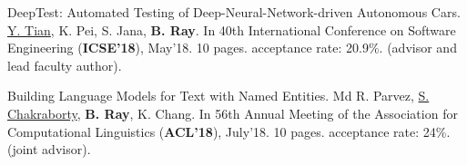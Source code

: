 
\newcommand\blue[1]{\textcolor[rgb]{0.00,0.00,1.00}{\textbf{#1}}} 


\begin{cventries}
{
  \begin{cvenumerate}
        \item 
        \paper
        {DeepTest: Automated Testing of Deep-Neural-Network-driven Autonomous Cars.}
        {\underline{Y. Tian}, K. Pei, S. Jana, \textbf{B. Ray}.} 
        {In 40th International Conference on Software Engineering (\blue{ICSE’18}), May’18.}
        {10 pages.} 
        {acceptance rate: 20.9\%.}
        {}
        {(advisor and lead faculty author).
        }
        \item 
        \paper
        {Building Language Models for Text with Named Entities.}
        {Md R. Parvez, \underline{S. Chakraborty}, \textbf{B. Ray}, K. Chang.}
        {In 56th Annual Meeting of the Association for Computational Linguistics (\blue{ACL’18}), July'18.}
        {10 pages.}
        {acceptance rate: 24\%.}
        {}
        {(joint advisor).}
    \end{cvenumerate}
}
         

\end{cventries}
